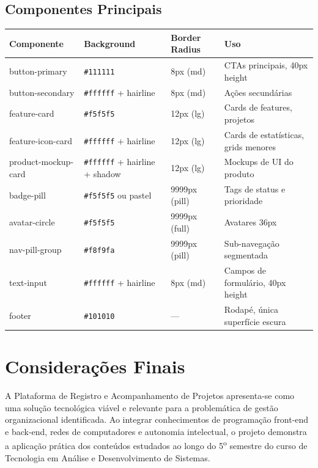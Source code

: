 \documentclass[a4paper,12pt,oneside]{article}
\begin{document}
\subsection{Componentes Principais}

\begin{table}[H]
\centering
\small
\begin{tabularx}{\textwidth}{l l l X}
\toprule
\textbf{Componente} & \textbf{Background} & \textbf{Border Radius} & \textbf{Uso} \\
\midrule
button-primary & \texttt{\#111111} & 8px (md) & CTAs principais, 40px height \\
button-secondary & \texttt{\#ffffff} + hairline & 8px (md) & Ações secundárias \\
feature-card & \texttt{\#f5f5f5} & 12px (lg) & Cards de features, projetos \\
feature-icon-card & \texttt{\#ffffff} + hairline & 12px (lg) & Cards de estatísticas, grids menores \\
product-mockup-card & \texttt{\#ffffff} + hairline + shadow & 12px (lg) & Mockups de UI do produto \\
badge-pill & \texttt{\#f5f5f5} ou pastel & 9999px (pill) & Tags de status e prioridade \\
avatar-circle & \texttt{\#f5f5f5} & 9999px (full) & Avatares 36px \\
nav-pill-group & \texttt{\#f8f9fa} & 9999px (pill) & Sub-navegação segmentada \\
text-input & \texttt{\#ffffff} + hairline & 8px (md) & Campos de formulário, 40px height \\
footer & \texttt{\#101010} & --- & Rodapé, única superfície escura \\
\bottomrule
\end{tabularx}
\end{table}

\section{Considerações Finais}

A Plataforma de Registro e Acompanhamento de Projetos apresenta-se como uma solução tecnológica viável e relevante para a problemática de gestão organizacional identificada. Ao integrar conhecimentos de programação front-end e back-end, redes de computadores e autonomia intelectual, o projeto demonstra a aplicação prática dos conteúdos estudados ao longo do 5\textsuperscript{o} semestre do curso de Tecnologia em Análise e Desenvolvimento de Sistemas.
\end{document}
